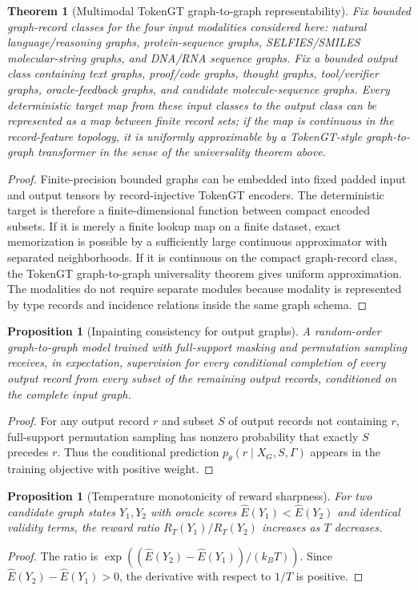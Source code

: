 \documentclass[11pt]{article}
\newtheorem{theorem}[definition]{Theorem}
\newtheorem{proposition}[definition]{Proposition}
\newcommand{\1}{\mathbf{1}}
\begin{document}
\begin{theorem}[Multimodal TokenGT graph-to-graph representability]
Fix bounded graph-record classes for the four input modalities considered here: natural language/reasoning graphs, protein-sequence graphs, SELFIES/SMILES molecular-string graphs, and DNA/RNA sequence graphs. Fix a bounded output class containing text graphs, proof/code graphs, thought graphs, tool/verifier graphs, oracle-feedback graphs, and candidate molecule-sequence graphs. Every deterministic target map from these input classes to the output class can be represented as a map between finite record sets; if the map is continuous in the record-feature topology, it is uniformly approximable by a TokenGT-style graph-to-graph transformer in the sense of the universality theorem above.
\end{theorem}
\begin{proof}
Finite-precision bounded graphs can be embedded into fixed padded input and output tensors by record-injective TokenGT encoders. The deterministic target is therefore a finite-dimensional function between compact encoded subsets. If it is merely a finite lookup map on a finite dataset, exact memorization is possible by a sufficiently large continuous approximator with separated neighborhoods. If it is continuous on the compact graph-record class, the TokenGT graph-to-graph universality theorem gives uniform approximation. The modalities do not require separate modules because modality is represented by type records and incidence relations inside the same graph schema.
\end{proof}

\begin{proposition}[Inpainting consistency for output graphs]
A random-order graph-to-graph model trained with full-support masking and permutation sampling receives, in expectation, supervision for every conditional completion of every output record from every subset of the remaining output records, conditioned on the complete input graph.
\end{proposition}
\begin{proof}
For any output record \(r\) and subset \(S\) of output records not containing \(r\), full-support permutation sampling has nonzero probability that exactly \(S\) precedes \(r\). Thus the conditional prediction \(p_\theta(r\mid X_G,S,\Gamma)\) appears in the training objective with positive weight.
\end{proof}

\begin{proposition}[Temperature monotonicity of reward sharpness]
For two candidate graph states \(Y_1,Y_2\) with oracle scores \(\widehat E(Y_1)<\widehat E(Y_2)\) and identical validity terms, the reward ratio \(R_T(Y_1)/R_T(Y_2)\) increases as \(T\) decreases.
\end{proposition}
\begin{proof}
The ratio is \(\exp((\widehat E(Y_2)-\widehat E(Y_1))/(k_BT))\). Since \(\widehat E(Y_2)-\widehat E(Y_1)>0\), the derivative with respect to \(1/T\) is positive.
\end{proof}
\end{document}
